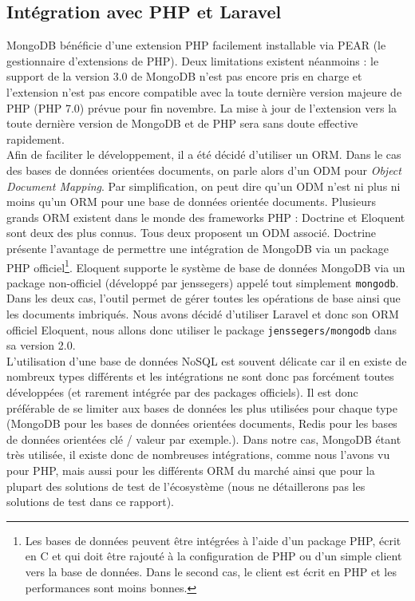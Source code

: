 \subsection{Intégration avec PHP et Laravel}%
\label{sub:integration_avec_php_et_laravel}

	MongoDB bénéficie d'une extension PHP facilement installable via PEAR (le gestionnaire d'extensions de PHP). Deux limitations existent néanmoins : le support de la version 3.0 de MongoDB n'est pas encore pris en charge et l'extension n'est pas encore compatible avec la toute dernière version majeure de PHP (PHP 7.0) prévue pour fin novembre. La mise à jour de l'extension vers la toute dernière version de MongoDB et de PHP sera sans doute effective rapidement.\\

	Afin de faciliter le développement, il a été décidé d'utiliser un ORM. Dans le cas des bases de données orientées documents, on parle alors d'un ODM pour \textit{Object Document Mapping}. Par simplification, on peut dire qu'un ODM n'est ni plus ni moins qu'un ORM pour une base de données orientée documents. Plusieurs grands ORM existent dans le monde des frameworks PHP : Doctrine et Eloquent sont deux des plus connus. Tous deux proposent un ODM associé. Doctrine présente l'avantage de permettre une intégration de MongoDB via un package PHP officiel\footnote{Les bases de données peuvent être intégrées à l'aide d'un package PHP, écrit en C et qui doit être rajouté à la configuration de PHP ou d'un simple client vers la base de données. Dans le second cas, le client est écrit en PHP et les performances sont moins bonnes.}. Eloquent supporte le système de base de données MongoDB via un package non-officiel (développé par jenssegers) appelé tout simplement \verb|mongodb|. Dans les deux cas, l'outil permet de gérer toutes les opérations de base ainsi que les documents imbriqués. Nous avons décidé d'utiliser Laravel et donc son ORM officiel Eloquent, nous allons donc utiliser le package \verb|jenssegers/mongodb| dans sa version 2.0.\\

	L'utilisation d'une base de données NoSQL est souvent délicate car il en existe de nombreux types différents et les intégrations ne sont donc pas forcément toutes développées (et rarement intégrée par des packages officiels). Il est donc préférable de se limiter aux bases de données les plus utilisées pour chaque type (MongoDB pour les bases de données orientées documents, Redis pour les bases de données orientées clé / valeur par exemple.). Dans notre cas, MongoDB étant très utilisée, il existe donc de nombreuses intégrations, comme nous l'avons vu pour PHP, mais aussi pour les différents ORM du marché ainsi que pour la plupart des solutions de test de l'écosystème (nous ne détaillerons pas les solutions de test dans ce rapport).

